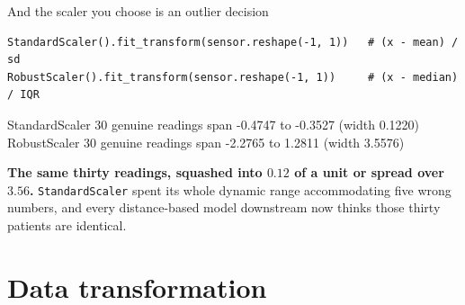 \documentclass[aspectratio=169]{beamer}
\begin{document}
\begin{frame}[fragile,shrink=4]{And the scaler you choose is an outlier decision}
\begin{lstlisting}
StandardScaler().fit_transform(sensor.reshape(-1, 1))   # (x - mean) / sd
RobustScaler().fit_transform(sensor.reshape(-1, 1))     # (x - median) / IQR
\end{lstlisting}
\begin{outblk}
  StandardScaler  30 genuine readings span -0.4747 to -0.3527  (width 0.1220)
  RobustScaler    30 genuine readings span -2.2765 to  1.2811  (width 3.5576)
\end{outblk}
\begin{center}\small
  \textbf{The same thirty readings, squashed into $0.12$ of a unit or spread
  over $3.56$.} \texttt{StandardScaler} spent its whole dynamic range
  accommodating five wrong numbers, and every distance-based model downstream
  now thinks those thirty patients are identical.
\end{center}
\end{frame}

\section[Transform]{Data transformation}
\label{sec:transform}
\end{document}

